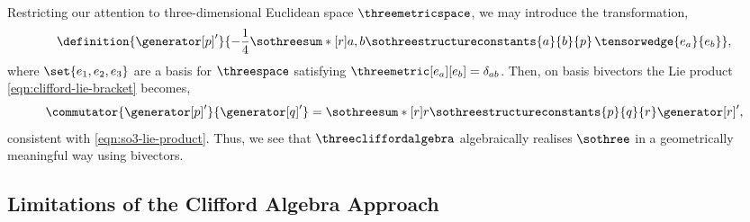 \documentclass{article}
\begin{document}
Restricting our attention to three-dimensional Euclidean space $\threemetricspace$, we may introduce the transformation,
\begin{equation}\label{eqn:bivector-generator-transform-clifford}
    \definition{\generator[p]'}{-\frac{1}{4}\sothreesum*[r]{a,b}\sothreestructureconstants{a}{b}{p}\,\tensorwedge{e_{a}}{e_{b}}},
\end{equation}
\noindent where $\set{e_{1},e_{2},e_{3}}$ are a basis for $\threespace$ satisfying $\threemetric[e_{a}][e_{b}]=\delta_{ab}$. Then, on basis bivectors the Lie product \eqref{eqn:clifford-lie-bracket} becomes,
\begin{equation}
    \commutator{\generator[p]'}{\generator[q]'}=\sothreesum*[r]{r}\sothreestructureconstants{p}{q}{r}\generator[r]',
\end{equation}
\noindent consistent with \eqref{eqn:so3-lie-product}. Thus, we see that $\threecliffordalgebra$ algebraically realises $\sothree$ in a geometrically meaningful way using bivectors.

\subsection{Limitations of the Clifford Algebra Approach}\label{sec:clifford-limitations}
\end{document}
